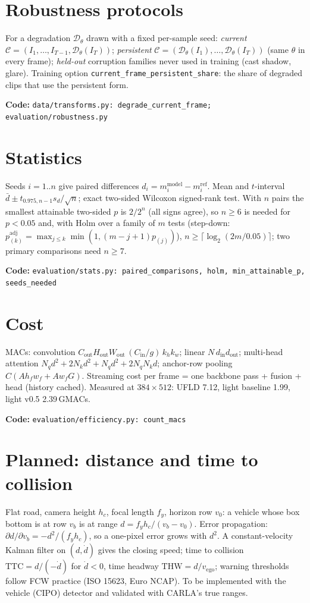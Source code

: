 \documentclass[10pt,a4paper]{article}
\newcommand{\code}[1]{\texttt{\small #1}}
\newcommand{\impl}[1]{\par\noindent\textcolor{blue!50!black}{\small\textbf{Code:} \texttt{#1}}\par}
\theoremstyle{definition}
\begin{document}
\section{Robustness protocols}
For a degradation $\mathcal D_\theta$ drawn with a fixed per-sample seed: \emph{current}
$\mathcal C=(I_1,\dots,I_{T-1},\mathcal D_\theta(I_T))$; \emph{persistent}
$\mathcal C=(\mathcal D_\theta(I_1),\dots,\mathcal D_\theta(I_T))$ (same $\theta$ in every frame); \emph{held-out}
corruption families never used in training (cast shadow, glare). Training option
\code{current\_frame\_persistent\_share}: the share of degraded clips that use the persistent form.
\impl{data/transforms.py: degrade\_current\_frame; evaluation/robustness.py}

\section{Statistics}
Seeds $i=1..n$ give paired differences $d_i=m_i^{\mathrm{model}}-m_i^{\mathrm{ref}}$. Mean and $t$-interval
$\bar d\pm t_{0.975,n-1}s_d/\sqrt n$; exact two-sided Wilcoxon signed-rank test. With $n$ pairs the smallest attainable
two-sided $p$ is $2/2^n$ (all signs agree), so $n\ge6$ is needed for $p<0.05$ and, with Holm over a family of $m$
tests (step-down: $p_{(k)}^{\mathrm{adj}}=\max_{j\le k}\min(1,(m-j+1)p_{(j)})$), $n\ge\lceil\log_2(2m/0.05)\rceil$; two
primary comparisons need $n\ge7$.
\impl{evaluation/stats.py: paired\_comparisons, holm, min\_attainable\_p, seeds\_needed}

\section{Cost}
MACs: convolution $C_{\mathrm{out}}H_{\mathrm{out}}W_{\mathrm{out}}\,(C_{\mathrm{in}}/g)\,k_hk_w$; linear
$N\,d_{\mathrm{in}}d_{\mathrm{out}}$; multi-head attention $N_q d^2+2N_kd^2+N_qd^2+2N_qN_kd$; anchor-row pooling
$C(Ah_fw_f+Aw_fG)$. Streaming cost per frame = one backbone pass + fusion + head (history cached).
Measured at $384{\times}512$: UFLD 7.12, light baseline 1.99, light v0.5 2.39\,GMACs.
\impl{evaluation/efficiency.py: count\_macs}

\section{Planned: distance and time to collision}
Flat road, camera height $h_c$, focal length $f_y$, horizon row $v_0$: a vehicle whose box bottom is at row $v_b$ is at
range $d=f_yh_c/(v_b-v_0)$. Error propagation: $\partial d/\partial v_b=-d^2/(f_yh_c)$, so a one-pixel error grows with
$d^2$. A constant-velocity Kalman filter on $(d,\dot d)$ gives the closing speed; time to collision
$\mathrm{TTC}=d/(-\dot d)$ for $\dot d<0$, time headway $\mathrm{THW}=d/v_{\mathrm{ego}}$; warning thresholds follow
FCW practice (ISO 15623, Euro NCAP). To be implemented with the vehicle (CIPO) detector and validated with CARLA's
true ranges.
\end{document}
